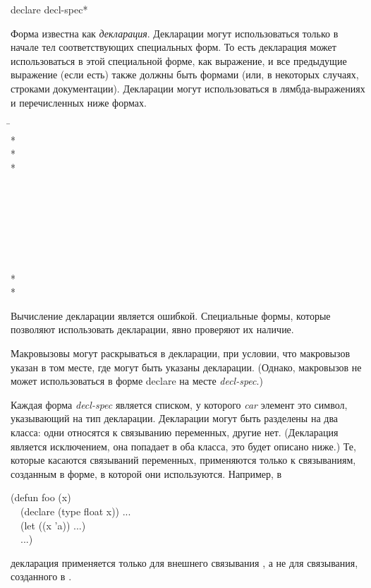 \begin{defspec}
declare {decl-spec}*

Форма  известна как \emph{декларация}.
Декларации могут использоваться только в начале тел соответствующих специальных
форм. То есть декларация может использоваться в этой специальной форме, как
выражение, и все предыдущие  выражение (если есть) также должны быть формами
 (или, в некоторых случаях, строками документации).
Декларации могут использоваться в лямбда-выражениях и перечисленных ниже формах.
\begin{lisp}
\hskip 12pc\=\kill
{}\> \\*
\> \\*
\> \\*
\> \\
\> \\
\> \\
\> \\
\> \\
\> \\
\> \\
\> \\*
\> \\*
\end{lisp}

Вычисление декларации является ошибкой. Специальные формы, которые позволяют
использовать декларации, явно проверяют их наличие.

Макровызовы могут раскрываться в декларации, при условии, что макровызов указан
в том месте, где могут быть указаны декларации.
(Однако, макровызов не может использоваться в форме declare на месте \emph{decl-spec}.)

Каждая форма \emph{decl-spec} является списком, у которого \emph{car} элемент
это символ, указывающий на тип декларации. Декларации могут быть разделены на
два класса: одни относятся к связыванию переменных, другие нет.
(Декларация  является исключением, она попадает в оба класса, это
будет описано ниже.) 
Те, которые касаются связываний переменных, применяются только к связываниям,
созданным в форме, в которой они используются. Например, в 
\begin{lisp}
(defun foo (x) \\
~~(declare (type float x)) ... \\
~~(let ((x 'a)) ...) \\
~~...)
\end{lisp}
декларация  применяется только для внешнего связывания , а не
для связывания, созданного в .


\end{defspec}
